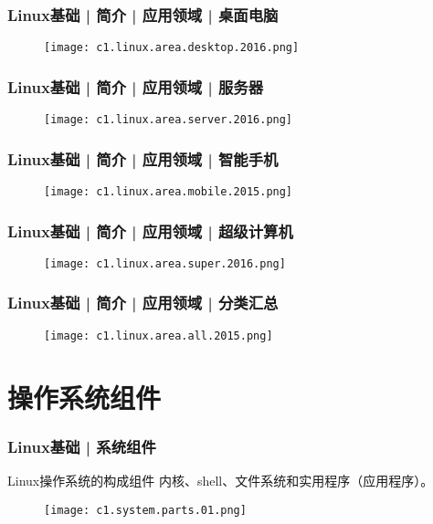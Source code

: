 \begin{frame}
  \frametitle{Linux基础 | 简介 | 应用领域 | 桌面电脑}
  \begin{figure}
    \centering
    \texttt{[image: c1.linux.area.desktop.2016.png]}
  \end{figure}
\end{frame}

\begin{frame}
  \frametitle{Linux基础 | 简介 | 应用领域 | 服务器}
  \begin{figure}
    \centering
    \texttt{[image: c1.linux.area.server.2016.png]}
  \end{figure}
\end{frame}

\begin{frame}
  \frametitle{Linux基础 | 简介 | 应用领域 | 智能手机}
  \begin{figure}
    \centering
    \texttt{[image: c1.linux.area.mobile.2015.png]}
  \end{figure}
\end{frame}

\begin{frame}
  \frametitle{Linux基础 | 简介 | 应用领域 | 超级计算机}
  \begin{figure}
    \centering
    \texttt{[image: c1.linux.area.super.2016.png]}
  \end{figure}
\end{frame}

\begin{frame}
  \frametitle{Linux基础 | 简介 | 应用领域 | 分类汇总}
  \begin{figure}
    \centering
    \texttt{[image: c1.linux.area.all.2015.png]}
  \end{figure}
\end{frame}

\section{操作系统组件}
\begin{frame}
  \frametitle{Linux基础 | 系统组件}
  \begin{block}{Linux操作系统的\alert{构成组件}}
    内核、shell、文件系统和实用程序（应用程序）。
  \end{block}
  \begin{figure}
    \centering
    \texttt{[image: c1.system.parts.01.png]}
  \end{figure}
\end{frame}

